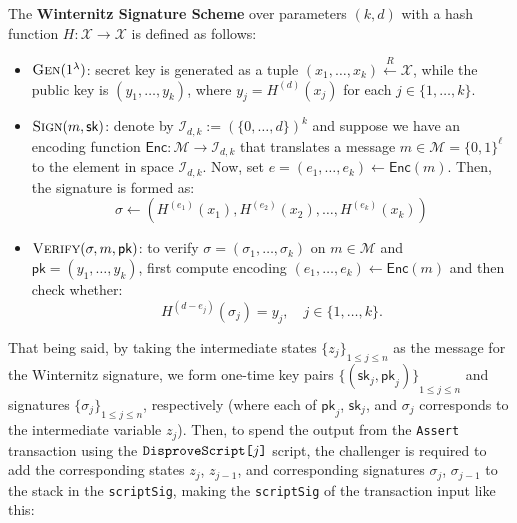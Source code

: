 \documentclass{iacrtrans}
\begin{document}
\begin{definition}
  The \textbf{Winternitz Signature Scheme} over parameters $(k,d)$ with a hash
  function $H: \mathcal{X} \to \mathcal{X}$ is defined as follows:
  \begin{itemize}
    \item $\textsc{Gen}(1^{\lambda})$: secret key is generated as a tuple
      $(x_1,\dots,x_k) \xleftarrow{R} \mathcal{X}$, while the public key is
      $(y_1,\dots,y_k)$, where $y_j = H^{(d)}(x_j)$ for each $j \in
      \{1,\dots,k\}$.
    \item $\textsc{Sign}(m,\mathsf{sk})$: denote by $\mathcal{I}_{d,k} :=
      {(\{0,\dots,d\})}^k$ and suppose we have an encoding function
      $\mathsf{Enc}: \mathcal{M} \to \mathcal{I}_{d,k}$ that translates a
      message $m \in \mathcal{M} = {\{0,1\}}^{\ell}$ to the element in space
      $\mathcal{I}_{d,k}$. Now, set $e = (e_1,\dots,e_k) \gets \mathsf{Enc}(m)$.
      Then, the signature is formed as:
      \begin{equation*}
        \sigma \gets ({H}^{(e_1)}(x_1), H^{(e_2)}(x_2), \dots, H^{(e_k)}(x_k))
      \end{equation*}
    \item $\textsc{Verify}(\sigma,m,\mathsf{pk})$: to verify $\sigma =
      (\sigma_1,\dots,\sigma_k)$ on $m \in \mathcal{M}$ and
      $\mathsf{pk}=(y_1,\dots,y_k)$, first compute encoding $(e_1,\dots,e_k)
      \gets \mathsf{Enc}(m)$ and then check whether:
      \begin{equation*}
        H^{(d-e_j)}(\sigma_j) = y_j, \quad j \in \{1,\dots,k\}.
      \end{equation*}
  \end{itemize}
\end{definition}

That being said, by taking the intermediate states ${\{z_j\}}_{1 \leq j \leq n}$
as the message for the Winternitz signature, we form one-time key pairs
${\{(\mathsf{sk}_j,\mathsf{pk}_j)\}}_{1 \leq j \leq n}$ and signatures
${\{\sigma_j\}}_{1 \leq j \leq n}$, respectively (where each of $\mathsf{pk}_j$,
$\mathsf{sk}_j$, and $\sigma_j$ corresponds to the intermediate variable $z_j$).
Then, to spend the output from the \texttt{Assert} transaction using the
$\texttt{DisproveScript[\text{$j$}]}$ script, the challenger is required to add
the corresponding states $z_j$, $z_{j-1}$, and corresponding signatures
$\sigma_j$, $\sigma_{j-1}$ to the stack in the \texttt{scriptSig}, making the
\texttt{scriptSig} of the transaction input like this:
\end{document}
